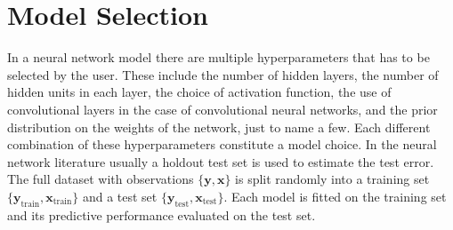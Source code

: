 \documentclass[12pt]{report}
\begin{document}
\section{Model Selection}
In a neural network model there are multiple hyperparameters that has to be selected by
the user. These include the number of hidden layers, the number of hidden
units in each layer, the choice of activation function, the use of
convolutional layers in the case of convolutional neural networks, and the prior
distribution on the weights of the network, just to name a few. Each different combination of these
hyperparameters constitute a model choice. In the neural network literature
usually a holdout test set is used to estimate the test error. The full dataset with observations
$\{\textbf{y},\textbf{x}\}$ is split randomly into a training set
$\{\textbf{y}_{\text{train}}, \textbf{x}_{\text{train}}\}$ and a test set $\{\textbf{y}_{\text{test}},
\textbf{x}_{\text{test}} \}$. Each model is fitted on the training set and its predictive
performance evaluated on the test set.
\end{document}
